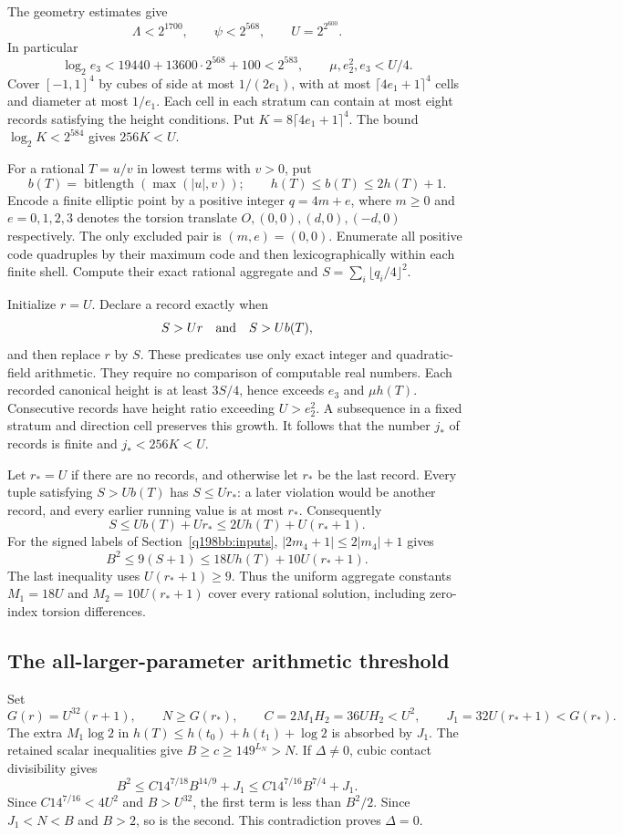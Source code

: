The geometry estimates give
\[
 \Lambda<2^{1700},\qquad \psi<2^{568},\qquad U=2^{2^{600}}.
\]
In particular
\[
 \log_2 e_3<19440+13600\cdot2^{568}+100<2^{583},
 \qquad \mu,e_2^2,e_3<U/4.
\]
Cover $[-1,1]^4$ by cubes of side at most $1/(2e_1)$, with at most
$\lceil4e_1+1\rceil^4$ cells and diameter at most $1/e_1$.
Each cell in each stratum can contain at most eight records satisfying
the height conditions. Put $K=8\lceil4e_1+1\rceil^4$.
The bound $\log_2K<2^{584}$ gives $256K<U$.

For a rational $T=u/v$ in lowest terms with $v>0$, put
\[
 b(T)=\operatorname{bitlength}(\max(|u|,v));\qquad
 h(T)\le b(T)\le2h(T)+1.
\]
Encode a finite elliptic point by a positive integer $q=4m+e$, where
$m\ge0$ and $e=0,1,2,3$ denotes the torsion translate
$O,(0,0),(d,0),(-d,0)$ respectively. The only excluded pair is $(m,e)=(0,0)$.
Enumerate all positive code quadruples by their maximum code and then
lexicographically within each finite shell. Compute their exact rational
aggregate and $S=\sum_i\lfloor q_i/4\rfloor^2$.

Initialize $r=U$. Declare a record exactly when
\[
 S>Ur\quad\hbox{and}\quad S>Ub(T),
\]
and then replace $r$ by $S$. These predicates use only exact integer and
quadratic-field arithmetic. They require no comparison of computable
real numbers. Each recorded canonical height is at least $3S/4$, hence
exceeds $e_3$ and $\mu h(T)$. Consecutive records have height ratio
exceeding $U>e_2^2$. A subsequence in a fixed stratum and direction cell
preserves this growth. It follows that the number $j_*$ of records is
finite and $j_*<256K<U$.

Let $r_*=U$ if there are no records, and otherwise let $r_*$ be the last
record. Every tuple satisfying $S>Ub(T)$ has $S\le Ur_*$: a later
violation would be another record, and every earlier running value is
at most $r_*$. Consequently
\[
 S\le Ub(T)+Ur_*\le2Uh(T)+U(r_*+1).
\]
For the signed labels of Section~\ref{q198bb:inputs},
$|2m_4+1|\le2|m_4|+1$ gives
\[
 B^2\le9(S+1)\le18Uh(T)+10U(r_*+1).
\]
The last inequality uses $U(r_*+1)\ge9$. Thus the uniform aggregate
constants $M_1=18U$ and $M_2=10U(r_*+1)$ cover every rational solution,
including zero-index torsion differences.

\subsection{The all-larger-parameter arithmetic threshold}
\label{q198bb:threshold-arithmetic}
Set
\[
 G(r)=U^{32}(r+1),\qquad N\ge G(r_*),\qquad
 C=2M_1H_2=36UH_2<U^2,\qquad J_1=32U(r_*+1)<G(r_*).
\]
The extra $M_1\log2$ in
$h(T)\le h(t_0)+h(t_1)+\log2$ is absorbed by $J_1$.
The retained scalar inequalities give $B\ge c\ge149^{L_N}>N$.
If $\Delta\ne0$, cubic contact divisibility gives
\[
 B^2\le C14^{7/18}B^{14/9}+J_1
      \le C14^{7/16}B^{7/4}+J_1.
\]
Since $C14^{7/16}<4U^2$ and $B>U^{32}$, the first term is less than
$B^2/2$. Since $J_1<N<B$ and $B>2$, so is the second. This contradiction
proves $\Delta=0$.

